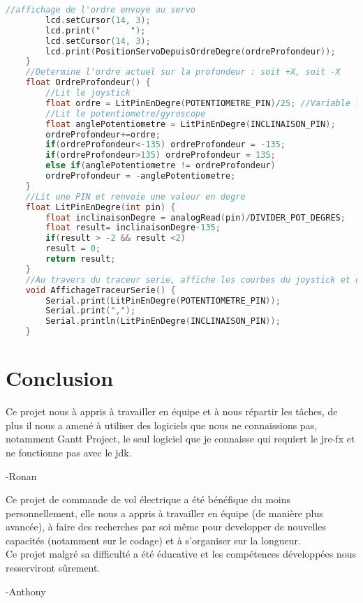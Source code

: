 \documentclass[a4paper, 9pt]{article}
\begin{document}
\begin{lstlisting}[language=c++]
		//affichage de l'ordre envoye au servo
		lcd.setCursor(14, 3);
		lcd.print("      ");
		lcd.setCursor(14, 3);
		lcd.print(PositionServoDepuisOrdreDegre(ordreProfondeur));
	}
	//Determine l'ordre actuel sur la profondeur : soit +X, soit -X
	float OrdreProfondeur() {
		//Lit le joystick
		float ordre = LitPinEnDegre(POTENTIOMETRE_PIN)/25; //Variable l'angle du joystick (divise par 25 pour rendre les deplacements du servo plus fluide)
		//Lit le potentiometre/gyroscope
		float anglePotentiometre = LitPinEnDegre(INCLINAISON_PIN);
		ordreProfondeur+=ordre;
		if(ordreProfondeur<-135) ordreProfondeur = -135;
		if(ordreProfondeur>135) ordreProfondeur = 135;
		else if(anglePotentiometre != ordreProfondeur)
		ordreProfondeur = -anglePotentiometre;
	}
	//Lit une PIN et renvoie une valeur en degre
	float LitPinEnDegre(int pin) {
		float inclinaisonDegre = analogRead(pin)/DIVIDER_POT_DEGRES;
		float result= inclinaisonDegre-135;
		if(result > -2 && result <2)
		result = 0;
		return result;
	}
	//Au travers du traceur serie, affiche les courbes du joystick et de l'inclinaison de l'avion
	void AffichageTraceurSerie() {
		Serial.print(LitPinEnDegre(POTENTIOMETRE_PIN));
		Serial.print(",");
		Serial.println(LitPinEnDegre(INCLINAISON_PIN));
	}
\end{lstlisting}
\section{Conclusion}
	Ce projet nous à appris à travailler en équipe et à nous répartir les tâches, de plus il nous a amené à utiliser des logiciels que nous ne connaissions pas, notamment Gantt Project, le seul logiciel que je connaisse qui requiert le jre-fx et ne fonctionne pas avec le jdk.
	\begin{flushright}
		-Ronan
	\end{flushright}
	\hspace{0.5cm} Ce projet de commande de vol électrique a été bénéfique du moins personnellement, elle nous a appris à travailler en équipe (de manière plus avancée), à faire des recherches par soi même pour developper de nouvelles capacités (notamment sur le codage) et à s'organiser sur la longueur.\\
	Ce projet malgré sa difficulté a été éducative et les compétences développées nous resserviront sûrement.
	\begin{flushright}
	 	-Anthony
	\end{flushright}
\end{document}
